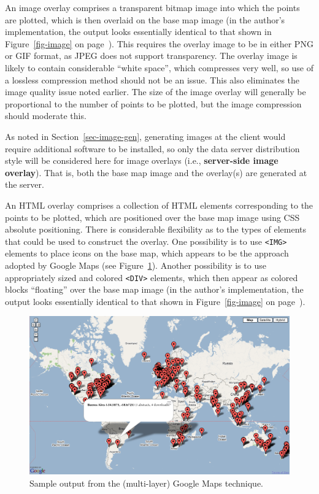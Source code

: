 \documentclass[acmnow]{acmtrans2m}
\begin{document}
An image overlay comprises a transparent bitmap image into which the
points are plotted, which is then overlaid on the base map image (in the
author's implementation, the output looks essentially identical to that
shown in Figure~\ref{fig-image} on page~\pageref{fig-image}). This
requires the overlay image to be in either PNG or GIF format, as JPEG
does not support transparency. The overlay image is likely to contain
considerable ``white space'', which compresses very well, so use of a
lossless compression method should not be an issue. This also eliminates
the image quality issue noted earlier. The size of the image overlay
will generally be proportional to the number of points to be plotted,
but the image compression should moderate this.

As noted in Section~\ref{sec-image-gen}, generating images at the client
would require additional software to be installed, so only the data
server distribution style will be considered here for image overlays
(i.e., \textbf{server-side image overlay}). That is, both the base map
image and the overlay(s) are generated at the server.

An HTML overlay comprises a collection of HTML elements corresponding to
the points to be plotted, which are positioned over the base map image
using CSS absolute positioning. There is considerable flexibility as to
the types of elements that could be used to construct the overlay. One
possibility is to use \verb|<IMG>| elements to place icons on the base
map, which appears to be the approach adopted by Google Maps (see
Figure~\ref{fig-google}). Another possibility is to use appropriately
sized and colored \verb|<DIV>| elements, which then appear as colored
blocks ``floating'' over the base map image (in the author's
implementation, the output looks essentially identical to that shown in
Figure~\ref{fig-image} on page~\pageref{fig-image}).


\begin{figure}
	\centering
	\includegraphics[width=\textwidth,keepaspectratio]{GoogleMap-full.png}
	\caption{Sample output from the (multi-layer) Google Maps technique.}
	\label{fig-google}
\end{figure}
\end{document}
